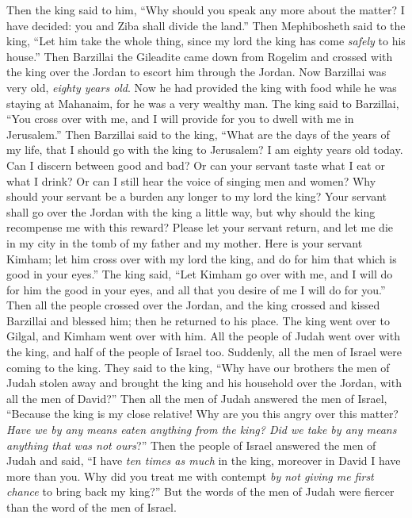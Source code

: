\begin{biblechapter}
\verse Then the king said to him, “Why should you speak any more about the matter? I have decided: you and Ziba shall divide the land.”
\verse Then Mephibosheth said to the king, “Let him take the whole thing, since my lord the king has come \textit{safely} to his house.”
\verse Then Barzillai the Gileadite came down from Rogelim and crossed with the king over the Jordan to escort him through the Jordan.
\verse Now Barzillai was very old, \textit{eighty years old}. Now he had provided the king with food while he was staying at Mahanaim, for he was a very wealthy man.
\verse The king said to Barzillai, “You cross over with me, and I will provide for you to dwell with me in Jerusalem.”
\verse Then Barzillai said to the king, “What are the days of the years of my life, that I should go with the king to Jerusalem?
\verse I am eighty years old today. Can I discern between good and bad? Or can your servant taste what I eat or what I drink? Or can I still hear the voice of singing men and women? Why should your servant be a burden any longer to my lord the king?
\verse Your servant shall go over the Jordan with the king a little way, but why should the king recompense me with this reward?
\verse Please let your servant return, and let me die in my city in the tomb of my father and my mother. Here is your servant Kimham; let him cross over with my lord the king, and do for him that which is good in your eyes.”
\verse The king said, “Let Kimham go over with me, and I will do for him the good in your eyes, and all that you desire of me I will do for you.”
\verse Then all the people crossed over the Jordan, and the king crossed and kissed Barzillai and blessed him; then he returned to his place.
\verse The king went over to Gilgal, and Kimham went over with him. All the people of Judah went over with the king, and half of the people of Israel too.
\verse Suddenly, all the men of Israel were coming to the king. They said to the king, “Why have our brothers the men of Judah stolen away and brought the king and his household over the Jordan, with all the men of David?”
\verse Then all the men of Judah answered the men of Israel, “Because the king is my close relative! Why are you this angry over this matter? \textit{Have we by any means eaten anything from the king? Did we take by any means anything that was not ours}?”
\verse Then the people of Israel answered the men of Judah and said, “I have \textit{ten times as much} in the king, moreover in David I have more than you. Why did you treat me with contempt \textit{by not giving me first chance} to bring back my king?” But the words of the men of Judah were fiercer than the word of the men of Israel.
\end{biblechapter}


